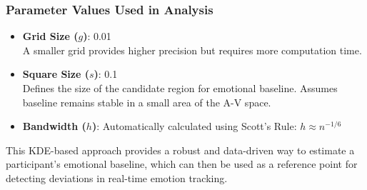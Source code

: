 \subsubsection*{Parameter Values Used in Analysis}

\begin{itemize}
    \item \textbf{Grid Size ($g$)}: 0.01 \\
    A smaller grid provides higher precision but requires more computation time.

    \item \textbf{Square Size ($s$)}: 0.1 \\
    Defines the size of the candidate region for emotional baseline. Assumes baseline remains stable in a small area of the A-V space.

    \item \textbf{Bandwidth ($h$)}: Automatically calculated using Scott’s Rule: $h \approx n^{-1/6}$
\end{itemize}

\par This KDE-based approach provides a robust and data-driven way to estimate a participant's emotional baseline, which can then be used as a reference point for detecting deviations in real-time emotion tracking.






